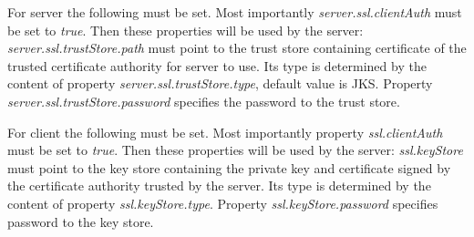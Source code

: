 \documentclass[12pt,a4paper]{report}
\begin{document}
For server the following must be set. Most importantly
\emph{server.ssl.clientAuth} must be set to \emph{true}. Then these properties
will be used by the server: \emph{server.ssl.trustStore.path} must point to the
trust store containing certificate of the trusted certificate authority for
server to use. Its type is determined by the content of property
\emph{server.ssl.trustStore.type}, default value is JKS. Property
\emph{server.ssl.trustStore.password} specifies the password to the trust
store.

For client the following must be set. Most importantly property
\emph{ssl.clientAuth} must be set to \emph{true}. Then these properties will be
used by the server: \emph{ssl.keyStore} must point to the key store containing
the private key and certificate signed by the certificate authority trusted by
the server. Its type is determined by the content of property
\emph{ssl.keyStore.type}. Property \emph{ssl.keyStore.password} specifies password to the key store.
\end{document}
